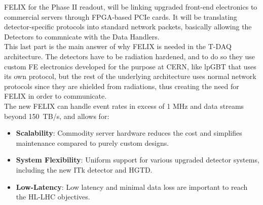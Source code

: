 \acs{FELIX} for the Phase II readout, will be linking upgraded front-end electronics to commercial servers through \acs{FPGA}-based \acs{PCIe} cards. It will be translating detector-specific protocols into standard network packets, basically allowing the Detectors to commnicate with the Data Handlers.\\
This last part is the main answer of why \acs{FELIX} is needed in the \acs{T-DAQ} architecture. The detectors have to be radiation hardened, and to do so they use custom \acl{FE} electronics developed for the purpose at \acs{CERN}, like \acl{lpGBT} \cite{lpgbt} that uses its own protocol, but the rest of the underlying architecture uses normal network protocols since they are shielded from radiations, thus creating the need for \acs{FELIX} in order to communicate.\\
The new \acs{FELIX} can handle event rates in excess of 1 MHz and data streams beyond 150~TB/s, and allows for:
\begin{itemize}
    \item \textbf{Scalability}: Commodity server hardware reduces the cost and simplifies maintenance compared to purely custom designs.
    \item \textbf{System Flexibility}: Uniform support for various upgraded detector systems, including the new \acs{ITk} detector and \acs{HGTD}.
    \item \textbf{Low-Latency}: Low latency and minimal data loss are important to reach the \acs{HL-LHC} objectives.
\end{itemize}
